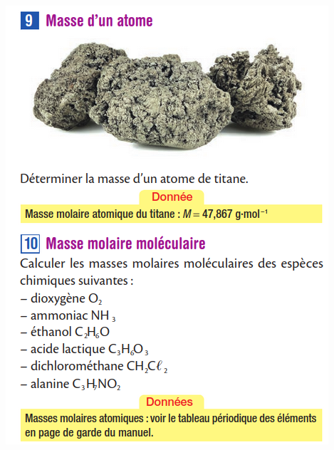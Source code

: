 \documentclass[10pt]{article}
\newcommand{\myscale}{0.41}
\begin{document}
\begin{center}
\begin{minipage}[c]{0.45\textwidth}
		\includegraphics[scale=\myscale]{assets/9-10.png}

	\end{minipage}
	\hspace{0.05\textwidth}
	\begin{minipage}[c]{0.45\textwidth}
		\centering


\end{minipage}
\end{center}
\end{document}
